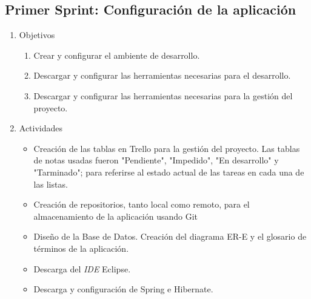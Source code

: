     \subsection{Primer Sprint: Configuración de la aplicación}
    \begin{enumerate}
        \item Objetivos
        \begin{enumerate}
            \item Crear y configurar el ambiente de desarrollo.
            \item Descargar y configurar las herramientas necesarias para el desarrollo.
            \item Descargar y configurar las herramientas necesarias para la gestión del proyecto.           
        \end{enumerate}
        \item Actividades
        \begin{itemize}
            \item Creación de las tablas en Trello para la gestión del proyecto. Las tablas de notas usadas fueron "Pendiente", "Impedido", "En desarrollo" y "Tarminado"; para referirse al estado actual de las tareas en cada una de las listas.
            \item Creación de repositorios, tanto local como remoto, para el almacenamiento de la aplicación usando Git
            \item Diseño de la Base de Datos. Creación del diagrama ER-E y el glosario de términos de la aplicación.
            \item Descarga del \textit{IDE} Eclipse. 
            \item Descarga y configuración de Spring e Hibernate. 
        \end{itemize}
    \end{enumerate}
        
        
